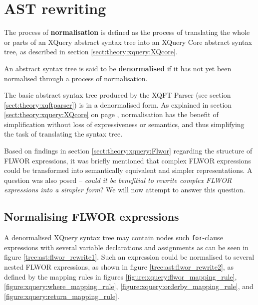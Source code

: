 \section{AST rewriting}
\label{sect:method:ast_rewrite}
\begin{myDefinition}
\label{definition:normalisation}
The process of \textbf{normalisation} is defined as the process of translating the
whole or parts of an XQuery abstract syntax tree into an XQuery Core abstract
syntax tree, as described in section \ref{sect:theory:xquery:XQcore}.
\end{myDefinition}

\begin{myDefinition}
\label{definition:denormalised}
An abstract syntax tree is said to be \textbf{denormalised} if it has not yet
been normalised through a process of normalisation.
\end{myDefinition}

The basic abstract syntax tree produced by the XQFT Parser (see section
\ref{sect:theory:xqftparser}) is in a denormalised form. As explained in
section \ref{sect:theory:xquery:XQcore} on page
\pageref{sect:theory:xquery:XQcore}, normalisation has the benefit of
simplification without loss of expressiveness or semantics, and thus
simplifying the task of translating the syntax tree.

Based on findings in section \ref{sect:theory:xquery:Flwor} regarding the
structure of FLWOR expressions, it was briefly mentioned that complex FLWOR
expressions could be transformed into semantically equivalent and simpler
representations. A question was also posed -- \emph{could it be
benefitial to rewrite complex FLWOR expressions into a simpler form}? We will
now attempt to answer this question.

\subsection{Normalising FLWOR expressions}
A denormalised XQuery syntax tree may contain nodes such \texttt{for}-clause expressions with several variable
declarations and assignments as can be seen in figure \ref{tree:ast:flwor_rewrite1}. Such an expression could be
normalised to several nested FLWOR expressions, as shown in figure \ref{tree:ast:flwor_rewrite2}, as defined by
the mapping rules in figures \ref{figure:xquery:flwor_mapping_rule},
\ref{figure:xquery:where_mapping_rule},
\ref{figure:xquery:orderby_mapping_rule}, and
\ref{figure:xquery:return_mapping_rule}.


